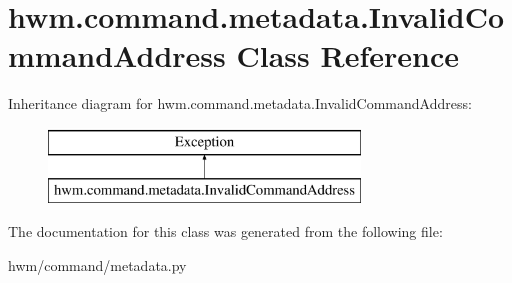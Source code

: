 \hypertarget{classhwm_1_1command_1_1metadata_1_1_invalid_command_address}{\section{hwm.\-command.\-metadata.\-Invalid\-Command\-Address Class Reference}
\label{classhwm_1_1command_1_1metadata_1_1_invalid_command_address}
}
Inheritance diagram for hwm.\-command.\-metadata.\-Invalid\-Command\-Address\-:\begin{figure}[H]
\begin{center}
\leavevmode
\includegraphics[height=2.000000cm]{classhwm_1_1command_1_1metadata_1_1_invalid_command_address}
\end{center}
\end{figure}


The documentation for this class was generated from the following file\-:\begin{DoxyCompactItemize}
\item 
hwm/command/metadata.\-py\end{DoxyCompactItemize}
